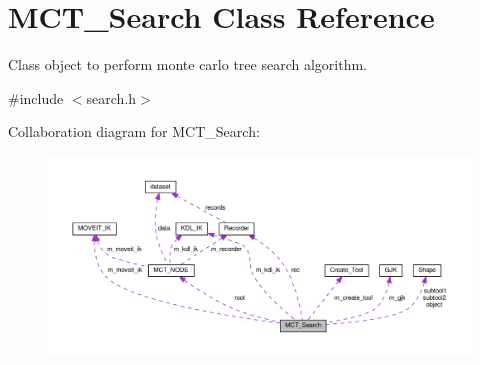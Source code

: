 \hypertarget{classMCT__Search}{}\section{M\+C\+T\+\_\+\+Search Class Reference}
\label{classMCT__Search}


Class object to perform monte carlo tree search algorithm.  




{\ttfamily \#include $<$search.\+h$>$}



Collaboration diagram for M\+C\+T\+\_\+\+Search\+:
\nopagebreak
\begin{figure}[H]
\begin{center}
\leavevmode
\includegraphics[width=350pt]{classMCT__Search__coll__graph}
\end{center}
\end{figure}
